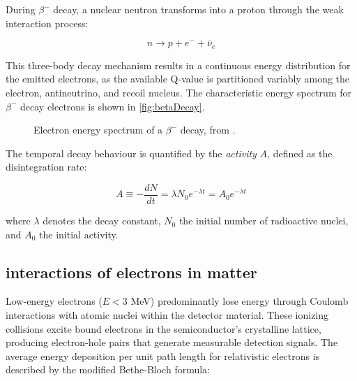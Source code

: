 During $\beta^{-}$ decay, a nuclear neutron transforms into a proton through the weak interaction process:

\begin{equation}
    n \rightarrow p + e^{-} + \bar{\nu}_e
\end{equation}

This three-body decay mechanism results in a continuous energy distribution for the emitted electrons, as the available Q-value is partitioned variably among the electron, antineutrino, and recoil nucleus. The characteristic energy spectrum for $\beta^{-}$ decay electrons is shown in \autoref{fig:betaDecay}.

\begin{figure}[H]
	\centering
	\caption{Electron energy spectrum of a $\beta^{-}$ decay, from \cite{corona}.}
	\label{fig:betaDecay}
\end{figure}

The temporal decay behaviour is quantified by the \textit{activity} $A$, defined as the disintegration rate:

\begin{equation}
    A \equiv -\frac{dN}{dt} = \lambda N_0 e^{-\lambda t} = A_0 e^{-\lambda t}
\end{equation}

where $\lambda$ denotes the decay constant, $N_0$ the initial number of radioactive nuclei, and $A_0$ the initial activity.

\subsection{interactions of electrons in matter}

Low-energy electrons ($E < 3$ MeV) predominantly lose energy through Coulomb interactions with atomic nuclei within the detector material. These ionizing collisions excite bound electrons in the semiconductor's crystalline lattice, producing electron-hole pairs that generate measurable detection signals. The average energy deposition per unit path length for relativistic electrons is described by the modified Bethe-Bloch formula:


